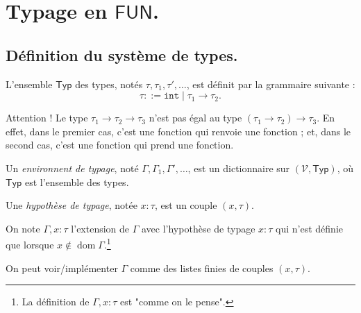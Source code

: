 \documentclass[../main]{subfiles}
\begin{document}
  \chapter{Typage en $\mathsf{FUN}$.}
  \minitoc
  \section{Définition du système de types.}

  L'ensemble $\mathsf{Typ}$ des types, notés $\tau, \tau_1, \tau',\ldots$, est définit par la grammaire suivante : \[
  \tau ::= \mathtt{int}  \mid  \tau_1 \to \tau_2
  .\]

  \begin{note}
    Attention ! Le type $\tau_1 \to \tau_2 \to \tau_3$ n'est pas égal au type $(\tau_1 \to \tau_2) \to \tau_3$.
    En effet, dans le premier cas, c'est une fonction qui renvoie une fonction ; et, dans le second cas, c'est une fonction qui prend une fonction.
  \end{note}

  \begin{defn}
    Un \textit{environnent de typage}, noté $\Gamma, \Gamma_1, \Gamma',\ldots$, est un dictionnaire sur $(\mathcal{V}, \mathsf{Typ})$, où $\mathsf{Typ}$ est l'ensemble des types.

    Une \textit{hypothèse de typage}, notée $x:\tau$, est un couple $(x,\tau)$.

    On note $\Gamma, x : \tau$ l'extension de $\Gamma$ avec l'hypothèse de typage $x : \tau$ qui n'est définie que lorsque  $x \not\in \operatorname{dom} \Gamma$.\footnote{La définition de $\Gamma, x : \tau$ est "comme on le pense".}
  \end{defn}

  \begin{rmk}
    On peut voir/implémenter $\Gamma$ comme des listes finies de couples $(x, \tau)$.
  \end{rmk}
\end{document}

